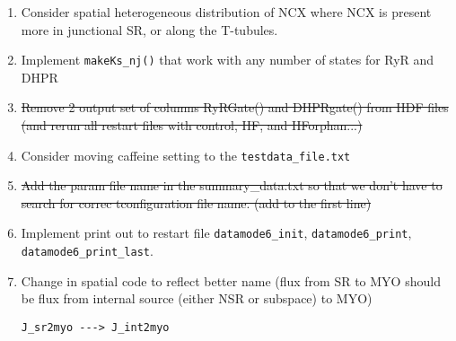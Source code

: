 \begin{enumerate}
\item Consider spatial heterogeneous distribution of NCX where NCX is
  present more in junctional SR, or along the T-tubules. 


\item Implement \verb!makeKs_nj()! that work with any number of states
  for  RyR and DHPR


\item \sout{Remove 2 output set of columns RyRGate() and
  DHPRgate() from HDF files (and rerun all restart files with
  control, HF, and HForphan...)}


\item Consider moving caffeine setting to the \verb!testdata_file.txt!

\item \sout{Add the param file name in the summary\_data.txt so that we
don't have to search for correc tconfiguration file name. (add to the first
line)}

\item Implement print out to restart file \verb!datamode6_init!,
\verb!datamode6_print!, \verb!datamode6_print_last!.

\item Change in spatial code to reflect better name (flux from SR to MYO should
be flux from internal source (either NSR or subspace) to MYO)
\begin{verbatim}
J_sr2myo ---> J_int2myo
\end{verbatim}


\end{enumerate}


